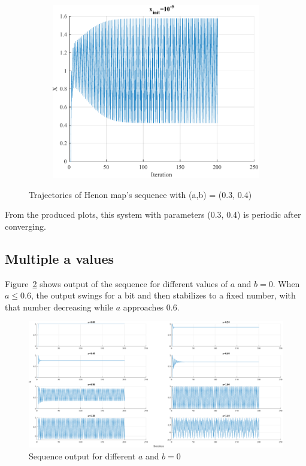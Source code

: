 \begin{figure}[htpb]
\begin{subfigure}{.47\textwidth}
		\includegraphics[width=\textwidth]{../Problem 3/prob3_x_init_1e-5.pdf}
		\caption{}
	\end{subfigure}
	\caption{Trajectories of Henon map's sequence with (a,b) = (0.3, 0.4)}
	\label{fig:prob3_x_init}
\end{figure}
From the produced plots, this system with parameters (0.3, 0.4) is periodic after converging.

\subsection{Multiple a values}
Figure~\ref{fig:prob3_multiple_a} shows output of the sequence for different values of $a$ and $b=0$. When $a \le 0.6$, the output swings for a bit and then stabilizes to a fixed number, with that number decreasing while $a$ approaches $0.6$.


\begin{figure}[h]
	\centering
	\includegraphics[width=\textwidth]{../Problem 3/prob3_(a)_multiple_a_b_0.pdf}
	\caption{Sequence output for different $a$ and $b=0$}
	\label{fig:prob3_multiple_a}
\end{figure}

